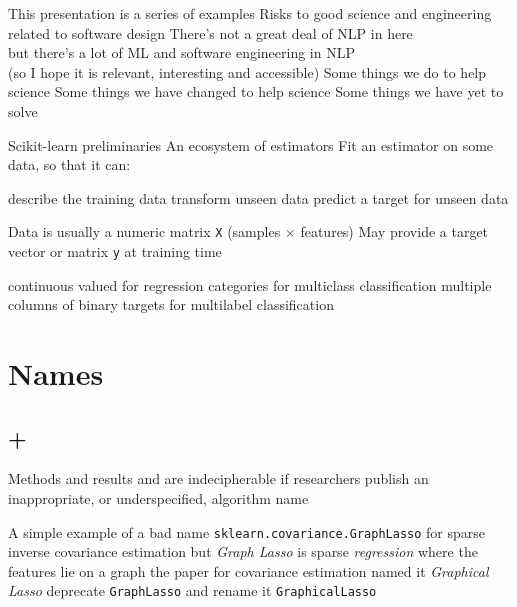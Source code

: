 \documentclass[aspectratio=169, 22pt]{beamer}
\newenvironment{sectionslide}
			{\subsection*{+}\begin{frame}[fragile,environment=sectionslide]\vfill\begin{center}\Large}
			{\end{center}\vfill\end{frame}}
\begin{document}

\begin{points}{This presentation is a series of examples}
	\p Risks to good science and engineering related to software design
	\vfill
	\p There's not a great deal of NLP in here \\
	but there's a lot of ML and software engineering in NLP\\
	(so I hope it is relevant, interesting and accessible)
	\vfill
	\p Some things we do to help science
	\p Some things we have changed to help science
	\p Some things we have yet to solve
\end{points}


\begin{points}{Scikit-learn preliminaries}
	\p An ecosystem of estimators
	\p Fit an estimator on some data, so that it can:
	\begin{itemize}
		\p describe the training data
		\p transform unseen data
		\p predict a target for unseen data
	\end{itemize}
	\p Data is usually a numeric matrix \verb|X| (samples $\times$ features)
	\p May provide a target vector or matrix \verb|y| at training time
	\begin{itemize}
		\p continuous valued for regression
		\p categories for multiclass classification
		\p multiple columns of binary targets for multilabel classification
	\end{itemize}
\end{points}


\section{Names}

\begin{sectionslide}
	Methods and results and are indecipherable if researchers publish an inappropriate, or underspecified, algorithm name
\end{sectionslide}


\begin{points}{A simple example of a bad name}
	\p \verb|sklearn.covariance.GraphLasso| for sparse inverse covariance estimation
	\p but \emph{Graph Lasso} is sparse \emph{regression} where the features lie on a graph
	\p the paper for covariance estimation named it \emph{Graphical Lasso}
	\pause
	\p[Solution] deprecate \verb|GraphLasso| and rename it \verb|GraphicalLasso|
\end{points}
\end{document}
